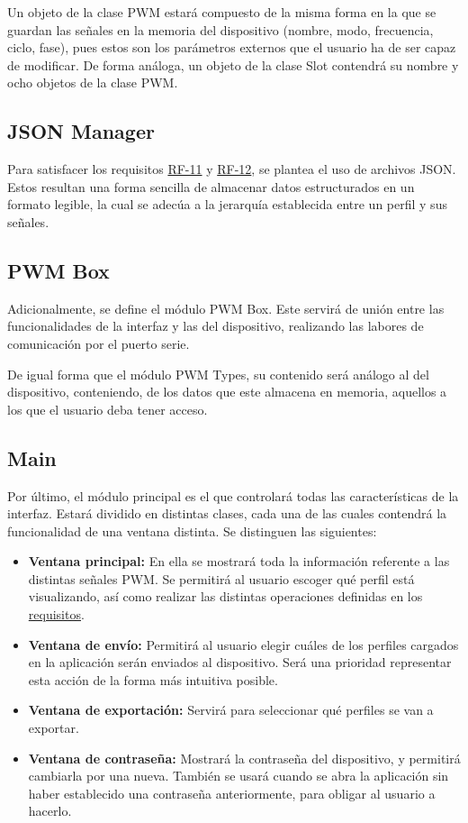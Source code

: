 Un objeto de la clase PWM estará compuesto de la misma forma en la que se guardan las señales en la memoria del dispositivo (nombre, modo, frecuencia, ciclo, fase), pues estos son los parámetros externos que el usuario ha de ser capaz de modificar. De forma análoga, un objeto de la clase Slot contendrá su nombre y ocho objetos de la clase PWM.

\subsection{JSON Manager}

Para satisfacer los requisitos \hyperref[tab:rf11]{RF-11} y \hyperref[tab:rf12]{RF-12}, se plantea el uso de archivos JSON. Estos resultan una forma sencilla de almacenar datos estructurados en un formato legible, la cual se adecúa a la jerarquía establecida entre un perfil y sus señales.

\subsection{PWM Box}

Adicionalmente, se define el módulo PWM Box. Este servirá de unión entre las funcionalidades de la interfaz y las del dispositivo, realizando las labores de comunicación por el puerto serie.

De igual forma que el módulo PWM Types, su contenido será análogo al del dispositivo, conteniendo, de los datos que este almacena en memoria, aquellos a los que el usuario deba tener acceso.

\subsection{Main}

Por último, el módulo principal es el que controlará todas las características de la interfaz. Estará dividido en distintas clases, cada una de las cuales contendrá la funcionalidad de una ventana distinta. Se distinguen las siguientes:

\begin{itemize}
    \item\textbf{Ventana principal:} En ella se mostrará toda la información referente a las distintas señales PWM. Se permitirá al usuario escoger qué perfil está visualizando, así como realizar las distintas operaciones definidas en los \hyperref[subsub:ui_requisitos]{requisitos}.
    \item\textbf{Ventana de envío:} Permitirá al usuario elegir cuáles de los perfiles cargados en la aplicación serán enviados al dispositivo. Será una prioridad representar esta acción de la forma más intuitiva posible.
    \item\textbf{Ventana de exportación:} Servirá para seleccionar qué perfiles se van a exportar.
    \item\textbf{Ventana de contraseña:} Mostrará la contraseña del dispositivo, y permitirá cambiarla por una nueva. También se usará cuando se abra la aplicación sin haber establecido una contraseña anteriormente, para obligar al usuario a hacerlo.
\end{itemize}

